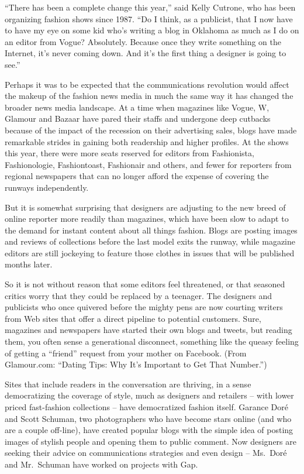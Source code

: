 ﻿\documentclass[12pt]{article}
\begin{document}
``There has been a complete change this year,'' said Kelly Cutrone, who has been organizing fashion
shows since 1987. ``Do I think, as a publicist, that I now have to have my eye on some kid who's
writing a blog in Oklahoma as much as I do on an editor from Vogue? Absolutely. Because once they
write something on the Internet, it's never coming down. And it's the first thing a designer is
going to see.''

Perhaps it was to be expected that the communications revolution would affect the makeup of the
fashion news media in much the same way it has changed the broader news media landscape. At a time
when magazines like Vogue, W, Glamour and Bazaar have pared their staffs and undergone deep cutbacks
because of the impact of the recession on their advertising sales, blogs have made remarkable
strides in gaining both readership and higher profiles. At the shows this year, there were more
seats reserved for editors from Fashionista, Fashionologie, Fashiontoast, Fashionair and others, and
fewer for reporters from regional newspapers that can no longer afford the expense of covering the
runways independently.

But it is somewhat surprising that designers are adjusting to the new breed of online reporter more
readily than magazines, which have been slow to adapt to the demand for instant content about all
things fashion. Blogs are posting images and reviews of collections before the last model exits the
runway, while magazine editors are still jockeying to feature those clothes in issues that will be
published months later.

So it is not without reason that some editors feel threatened, or that seasoned critics worry that
they could be replaced by a teenager. The designers and publicists who once quivered before the
mighty pens are now courting writers from Web sites that offer a direct pipeline to potential
customers. Sure, magazines and newspapers have started their own blogs and tweets, but reading them,
you often sense a generational disconnect, something like the queasy feeling of getting a ``friend''
request from your mother on Facebook. (From Glamour.com: ``Dating Tips: Why It's Important to Get
That Number.'')

Sites that include readers in the conversation are thriving, in a sense democratizing the coverage
of style, much as designers and retailers -- with lower priced fast-fashion collections -- have
democratized fashion itself. Garance Dor\'e and Scott Schuman, two photographers who have become
stars online (and who are a couple off-line), have created popular blogs with the simple idea of
posting images of stylish people and opening them to public comment. Now designers are seeking their
advice on communications strategies and even design -- Ms.~Dor\'e and Mr.~Schuman have worked on
projects with Gap.
\end{document}
